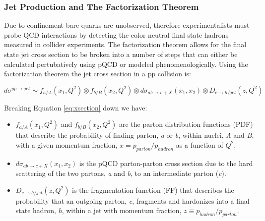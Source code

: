 \subsubsection{Jet Production and The Factorization Theorem}\label{sec:fac}

Due to confinement bare quarks are unobserved, therefore experimentalists must probe QCD interactions by detecting the color neutral final state hadrons measured in collider experiments.  The factorization theorem allows for the final state jet cross section to be broken into a number of steps that can either be calculated pertubatively using pQCD or modeled phenomenologically.  Using the factorization theorem the jet cross section in a pp collision is:


\begin{equation}
d\sigma^{pp \rightarrow jet} \sim f_{a/A}(x_{1},Q^{2}) \otimes  f_{b/B}(x_{2},Q^{2}) \otimes d\sigma_{ab \rightarrow c + X} (x_{1},x_{2}) \otimes D_{c \rightarrow h/jet}(z,Q^{2})
\label{eq:xsection}
\end{equation}

\noindent
Breaking Equation \ref{eq:xsection} down we have:

\begin{itemize}
\item  $ f_{a/A}(x_{1},Q^{2})$ and $ f_{b/B}(x_{2},Q^{2})$ are the parton distribution functions (PDF) that describe the probability of finding parton, \textit{a} or \textit{b}, within nuclei, \textit{A} and \textit{B}, with a given momentum fraction, $x = p_{parton} / p_{hadron} $ as a function of $Q^{2}$.
\item  $d\sigma_{ab \rightarrow c + X} (x_{1},x_{2})$ is the pQCD parton-parton cross section due to the hard scattering of the two partons, \textit{a} and \textit{b}, to an intermediate parton (\textit{c}).
\item   $ D_{c \rightarrow h/jet}(z,Q^{2})$ is the fragmentation function (FF) that describes the probability that an outgoing parton, \textit{c}, fragments and hardonizes into a final state hadron, \textit{h}, within a jet with momentum fraction, $z \equiv p_{hadron} / p_{parton}$.
\end{itemize}


